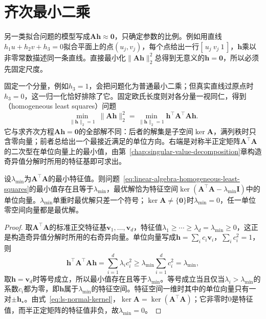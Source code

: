 \section{齐次最小二乘}
\label{sec:linear-algebra-homogeneous-estimation}

另一类拟合问题的模型写成$\bm A\bm h\approx\bm0$，只确定参数的比例。例如用直线$h_1u+h_2v+h_3=0$拟合平面上的点$(u_j,v_j)$，每个点给出一行$[\,u_j\ v_j\ 1\,]$，$\bm h$乘以非零常数描述同一条直线。直接最小化$\lVert\bm A\bm h\rVert_2^2$总得到无意义的$\bm h=\bm0$，所以必须先固定尺度。

固定一个分量，例如$h_3=1$，会把问题化为普通最小二乘；但真实直线过原点时$h_3=0$，这一归一化恰好排除了它。固定欧氏长度则对各分量一视同仁，得到（homogeneous least squares）问题
\begin{equation}
 \min_{\lVert\bm h\rVert_2=1}\ \lVert\bm A\bm h\rVert_2^2
 =\min_{\lVert\bm h\rVert_2=1}\bm h^\top\bm A^\top\bm A\bm h .
 \label{eq:linear-algebra-homogeneous-least-squares}
\end{equation}
它与求齐次方程$\bm A\bm h=\bm0$的全部解不同：后者的解集是子空间$\ker\bm A$，满列秩时只含零向量；前者总给出一个最接近满足的单位方向。右端是对称半正定矩阵$\bm A^\top\bm A$的二次型在单位向量上的最小值，由第~\ref{chap:singular-value-decomposition}章构造奇异值分解时所用的特征基即可求出。

\begin{theorem}[齐次最小二乘的最优解]
\label{thm:ls-homogeneous-minimizers}
设$\lambda_{\min}$为$\bm A^\top\bm A$的最小特征值。则问题~\eqref{eq:linear-algebra-homogeneous-least-squares}的最小值存在且等于$\lambda_{\min}$，最优解恰为特征空间$\ker(\bm A^\top\bm A-\lambda_{\min}\bm I)$中的单位向量。$\lambda_{\min}$单重时最优解只差一个符号；$\ker\bm A\neq\{\bm0\}$时$\lambda_{\min}=0$，任一单位零空间向量都是最优解。
\end{theorem}
\begin{proof}
取$\bm A^\top\bm A$的标准正交特征基$\bm v_1,\ldots,\bm v_d$，特征值$\lambda_1\geq\cdots\geq\lambda_d=\lambda_{\min}\geq0$，这正是构造奇异值分解时所用的右奇异向量。单位向量写成$\bm h=\sum_ic_i\bm v_i$，$\sum_ic_i^2=1$，则
\[
 \bm h^\top\bm A^\top\bm A\bm h=\sum_{i=1}^d\lambda_ic_i^2\geq\lambda_{\min}\sum_{i=1}^dc_i^2=\lambda_{\min},
\]
取$\bm h=\bm v_d$时等号成立，所以最小值存在且等于$\lambda_{\min}$。等号成立当且仅当$\lambda_i>\lambda_{\min}$的系数$c_i$都为零，即$\bm h$属于$\lambda_{\min}$的特征空间。特征空间一维时其中的单位向量只有一对$\pm\bm h_\star$。由式~\eqref{eq:ls-normal-kernel}，$\ker\bm A=\ker(\bm A^\top\bm A)$；它非零时$0$是特征值，而半正定矩阵的特征值非负，故$\lambda_{\min}=0$。
\end{proof}

